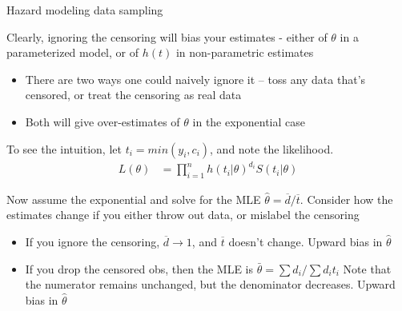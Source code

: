 \documentclass[notes,11pt, aspectratio=169]{beamer}
\newenvironment{wideitemize}{\itemize\addtolength{\itemsep}{10pt}}{\enditemize}
\begin{document}
\begin{frame}{Hazard modeling data sampling}
  \begin{wideitemize}
  \item Clearly, ignoring the censoring will bias your estimates -
    either of $\theta$ in a parameterized model, or of $h(t)$ in
    non-parametric estimates
    \begin{itemize}
    \item There are two ways one could naively ignore it -- toss any
      data that's censored, or treat the censoring as real data
    \item Both will give over-estimates of $\theta$ in the exponential case
    \end{itemize}
  \item To see the intuition, let $t_{i} = min(y_{i}, c_{i})$, and
    note the likelihood.
    \begin{align*}
      L(\theta) &= \prod_{i=1}^{n} h(t_{i}|\theta)^{d_{i}} S(t_{i}|\theta)
    \end{align*}
  \item Now assume the exponential and solve for the MLE
    $\hat{\theta} = \overline{d}/\overline{t}$. Consider how
    the estimates change if you either throw out data, or mislabel
    the censoring
    \begin{itemize}
    \item If you ignore the censoring, $\overline{d} \rightarrow 1$,
      and $\overline{t}$ doesn't change. Upward bias in
      $\hat{\theta}$
    \item If you drop the censored obs, then the MLE is
      $\bar{\theta} = \sum d_{i} / \sum d_{i} t_{i}$ Note that the
      numerator remains unchanged, but the denominator
      decreases. Upward bias in $\hat{\theta}$
    \end{itemize}
  \end{wideitemize}
\end{frame}
\end{document}
